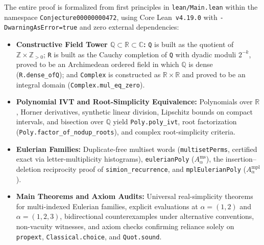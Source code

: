 \documentclass[11pt]{article}
\theoremstyle{definition}
\newcommand{\QQ}{\mathbb{Q}}
\newcommand{\RR}{\mathbb{R}}
\newcommand{\CC}{\mathbb{C}}
\newcommand{\ZZ}{\mathbb{Z}}
\begin{document}
The entire proof is formalized from first principles in \texttt{lean/Main.lean} within
the namespace \texttt{Conjecture00000000472}, using Core Lean~\texttt{v4.19.0} with
\texttt{-DwarningAsError=true} and zero external dependencies:
\begin{itemize}
  \item \textbf{Constructive Field Tower $\QQ \subset \RR \subset \CC$:} \texttt{Q} is built
  as the quotient of $\ZZ \times \ZZ_{>0}$; \texttt{R} is built as the Cauchy completion of
  \texttt{Q} with dyadic moduli $2^{-k}$, proved to be an Archimedean ordered field in which
  $\QQ$ is dense (\texttt{R.dense\_ofQ}); and \texttt{Complex} is constructed as $\RR \times \RR$
  and proved to be an integral domain (\texttt{Complex.mul\_eq\_zero}).
  \item \textbf{Polynomial IVT and Root-Simplicity Equivalence:} Polynomials over $\RR$,
  Horner derivatives, synthetic linear division, Lipschitz bounds on compact intervals, and
  bisection over $\QQ$ yield \texttt{Poly.poly\_ivt}, root factorization
  (\texttt{Poly.factor\_of\_nodup\_roots}), and complex root-simplicity criteria.
  \item \textbf{Eulerian Families:} Duplicate-free multiset words (\texttt{multisetPerms},
  certified exact via letter-multiplicity histograms), \texttt{eulerianPoly}
  ($A_\alpha^{\mathrm{ms}}$), the insertion--deletion reciprocity proof of
  \texttt{simion\_recurrence}, and \texttt{mplEulerianPoly} ($A_\alpha^{\mathrm{mpl}}$).
  \item \textbf{Main Theorems and Axiom Audits:} Universal real-simplicity theorems for
  multi-indexed Eulerian families, explicit evaluations at $\alpha=(1,2)$ and
  $\alpha=(1,2,3)$, bidirectional counterexamples under alternative conventions, non-vacuity
  witnesses, and axiom checks confirming reliance solely on \texttt{propext},
  \texttt{Classical.choice}, and \texttt{Quot.sound}.
\end{itemize}
\end{document}
